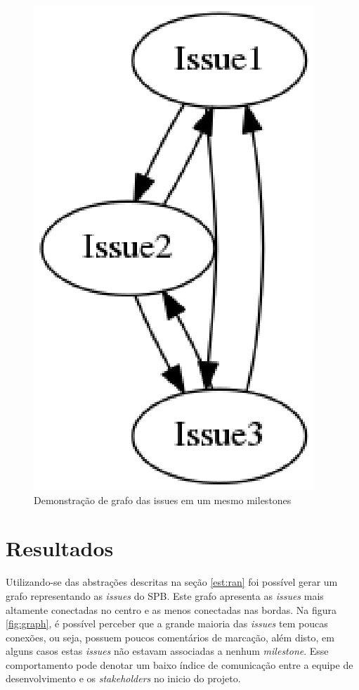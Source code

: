 \newpage
\begin{figure}[h]
    \centering
        \includegraphics[keepaspectratio=true,scale=0.5]{figuras/milestone-graph.eps}
    \caption{Demonstração de grafo das issues em um mesmo  milestones}
    \label{fig:milestone-graph}
\end{figure}

\section{Resultados}
\label{est:res}

Utilizando-se das abstrações descritas na seção \ref{est:ran} foi possível gerar um grafo representando as \textit{issues} do SPB. Este grafo apresenta as \textit{issues} mais altamente conectadas no centro e as menos conectadas nas bordas. Na figura \ref{fig:graph}, é possível perceber que a grande maioria das \textit{issues} tem poucas conexões, ou seja, possuem poucos comentários de marcação, além disto, em alguns casos estas \textit{issues} não estavam associadas a nenhum \textit{milestone}. Esse comportamento pode denotar um baixo índice de comunicação entre a equipe de desenvolvimento e os \textit{stakeholders} no inicio do projeto.

